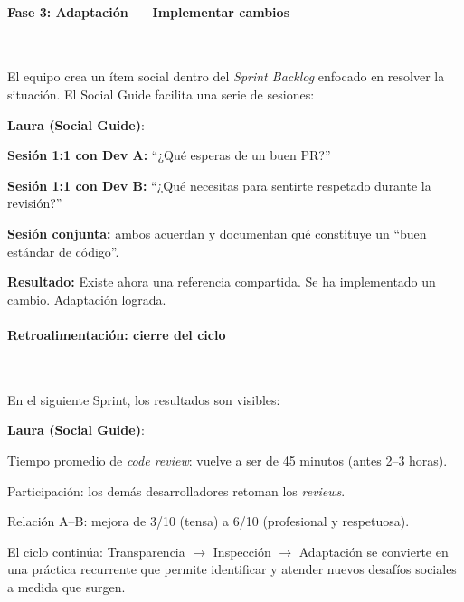 \paragraph{Fase 3: Adaptación — Implementar cambios}\mbox{}\\[-0.3\baselineskip]

\begin{escenario}
    El equipo crea un ítem social dentro del \textit{Sprint Backlog} enfocado en resolver la situación. El Social Guide facilita una serie de sesiones:

    \textbf{Laura (Social Guide)}:
    \begin{dialogo}
        \textbf{Sesión 1:1 con Dev A:} ``¿Qué esperas de un buen PR?''

        \textbf{Sesión 1:1 con Dev B:} ``¿Qué necesitas para sentirte respetado durante la revisión?''

        \textbf{Sesión conjunta:} ambos acuerdan y documentan qué constituye un ``buen estándar de código''.

    \end{dialogo}
    \textbf{Resultado:} Existe ahora una referencia compartida. Se ha implementado un cambio. Adaptación lograda.
\end{escenario}

\paragraph{Retroalimentación: cierre del ciclo}\mbox{}\\[-0.3\baselineskip]

\begin{escenario}
    En el siguiente Sprint, los resultados son visibles:

    \textbf{Laura (Social Guide)}:
    \begin{dialogo}
        Tiempo promedio de \textit{code review}: vuelve a ser de 45 minutos (antes 2--3 horas). 

        Participación: los demás desarrolladores retoman los \textit{reviews}. 

        Relación A--B: mejora de 3/10 (tensa) a 6/10 (profesional y respetuosa). 
    \end{dialogo}
\end{escenario}

El ciclo continúa: Transparencia $\rightarrow$ Inspección $\rightarrow$ Adaptación se convierte en una práctica recurrente que permite identificar y atender nuevos desafíos sociales a medida que surgen.

